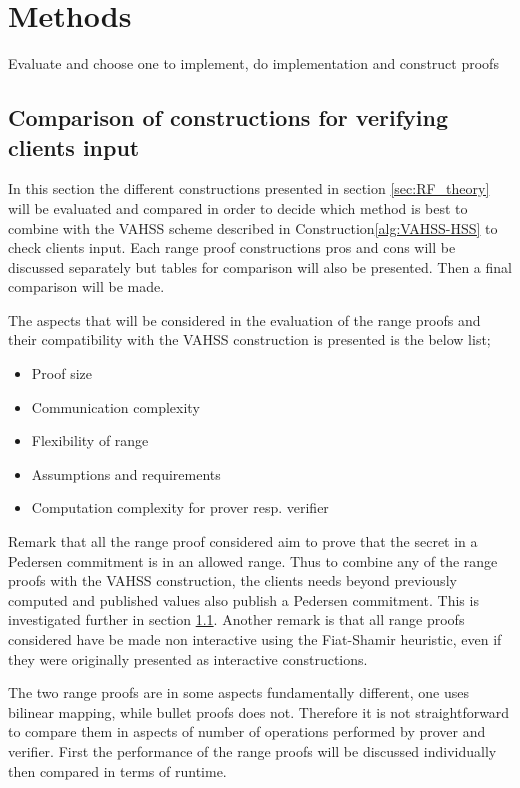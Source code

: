 \chapter{Methods}
\label{sec:Methods}
Evaluate and choose one to implement, do implementation and construct proofs

\section{Comparison of constructions for verifying clients input}
In this section the different constructions presented in section \ref{sec:RF_theory} will be evaluated and compared in order to decide which method is best to combine with the VAHSS scheme described in Construction\ref{alg:VAHSS-HSS} to check clients input. Each range proof constructions pros and cons will be discussed separately but tables for comparison will also be presented. Then a final comparison will be made.

The aspects that will be considered in the evaluation of the range proofs and their compatibility with the VAHSS construction is presented is the below list;
\begin{itemize}
    \item Proof size
    \item Communication complexity
    \item Flexibility of range
    \item Assumptions and requirements 
    \item Computation complexity for prover resp. verifier
\end{itemize}

Remark that all the range proof considered aim to prove that the secret in a Pedersen commitment is in an allowed range. Thus to combine any of the range proofs with the VAHSS construction, the clients needs beyond previously computed and published values also publish a Pedersen commitment. This is investigated further in section \ref{}. Another remark is that all range proofs considered have be made non interactive using the Fiat-Shamir heuristic, even if they were originally presented as interactive constructions. 


The two range proofs are in some aspects fundamentally different, one uses bilinear mapping,  while bullet proofs does not. Therefore it is not straightforward to compare them in aspects of number of operations performed by prover and verifier. First the performance of the range proofs will be discussed individually then compared in terms of runtime. 

